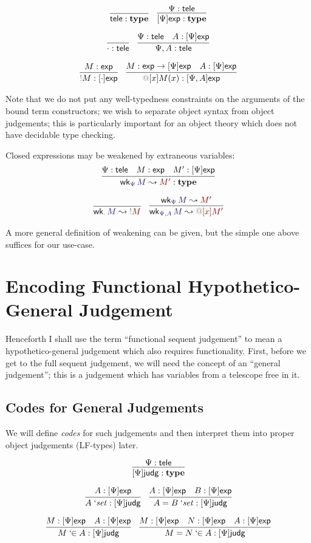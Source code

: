 \documentclass[acmtoplas]{acmtrans2m}
\makeatletter
\def\InputModeColorName{MidnightBlue}
\def\OutputModeColorName{Maroon}
\newcommand\InputMode[1]{{\color{\InputModeColorName}{#1}}}
\newcommand\OutputMode[1]{{\color{\OutputModeColorName}{#1}}}
\newcommand\type{\mathbf{type}}
\newcommand\sortexp{\mathsf{exp}}
\newcommand\sorttele{\mathsf{tele}}
\newcommand\sortoexp[1]{[#1]\sortexp}
\newcommand\sortj{\mathsf{judg}}
\newcommand\sortoj[1]{[#1]\sortj}
\newcommand\nobind[1]{{\color{Gray}!}#1}
\newcommand\bind[2]{{\color{Gray}@}[#1]#2}
\newcommand\weaken[3]{\mathsf{wk}_{\InputMode{#1}}\,\InputMode{#2}\leadsto\OutputMode{#3}}
\newcommand\qisset[1]{#1\;`\mathit{set}}
\newcommand\qeqset[2]{#1=#2\;`\mathit{set}}
\newcommand\qmem[2]{#1\;`\!\!\in#2}
\newcommand\qeqmem[3]{#1=#2\;`\!\!\in#3}
\makeatother
\begin{document}
\begin{gather*}
  \infer{\sorttele:\type}{}
  \quad
  \infer{
    \sortoexp{\Psi}:\type
  }{
    \Psi:\sorttele
  }\\[6pt]
  \infer{\cdot:\sorttele}{}
  \quad
  \infer{
    \Psi,A:\sorttele
  }{
    \Psi:\sorttele &
    A:\sortoexp{\Psi}
  }\\[6pt]
  \infer{
    \nobind{M}:\sortoexp{\cdot}
  }{
    M:\sortexp
  }
  \quad
  \infer{
    \bind{x}{M(x)}:\sortoexp{\Psi,A}
  }{
    M:\sortexp\to\sortoexp\Psi &
    A:\sortoexp\Psi
  }
\end{gather*}

Note that we do not put any well-typedness constraints on the arguments of the
bound term constructors; we wish to separate object syntax from object
judgements; this is particularly important for an object theory which does not
have decidable type checking.

Closed expressions may be weakened by extraneous variables:
\begin{gather*}
  \infer{
    \weaken{\Psi}{M}{M'}:\type
  }{
    \Psi:\sorttele &
    M:\sortexp &
    M':\sortoexp\Psi
  }\\[6pt]
  \infer{
    \weaken{\cdot}{M}{\nobind{M}}
  }{
  }\quad
  \infer{
    \weaken{\Psi,A}{M}{\bind{x}{M'}}
  }{
    \weaken{\Psi}{M}{M'}
  }
\end{gather*}

A more general definition of weakening can be given, but the simple one above
suffices for our use-case.

\section{Encoding Functional Hypothetico-General Judgement}
Henceforth I shall use the term ``functional sequent judgement'' to mean a
hypothetico-general judgement which also requires functionality. First, before
we get to the full sequent judgement, we will need the concept of an
``general judgement''; this is a judgement which has variables from
a telescope free in it.

\subsection{Codes for General Judgements}
We will define \emph{codes} for such judgements and then
interpret them into proper object judgements (LF-types) later.

\begin{gather*}
  \infer{
    \sortoj\Psi:\type
  }{
    \Psi:\sorttele
  }\\[6pt]
  \infer{
    \qisset{A}:\sortoj\Psi
  }{
    A:\sortoexp\Psi
  }
  \quad
  \infer{
    \qeqset{A}{B}:\sortoj\Psi
  }{
    A:\sortoexp\Psi &
    B:\sortoexp\Psi
  }\\[6pt]
  \infer{
    \qmem{M}{A}:\sortoj\Psi
  }{
    M:\sortoexp\Psi &
    A:\sortoexp\Psi
  }
  \quad
  \infer{
    \qeqmem{M}{N}{A}:\sortoj\Psi
  }{
    M:\sortoexp\Psi &
    N:\sortoexp\Psi &
    A:\sortoexp\Psi
  }
\end{gather*}
\end{document}
